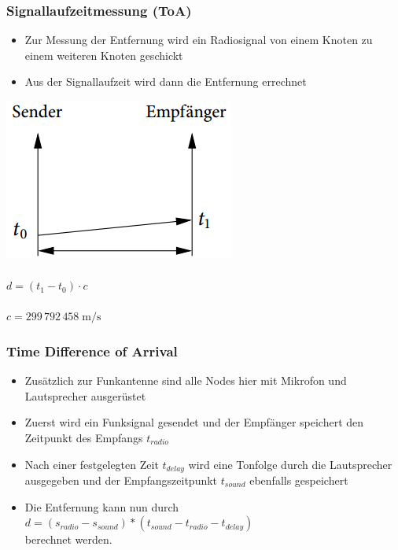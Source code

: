 \begin{frame}
  \frametitle{Signallaufzeitmessung (ToA)}
  \begin{itemize}
    \item Zur Messung der Entfernung wird ein Radiosignal von einem Knoten zu einem weiteren Knoten geschickt
    \item Aus der Signallaufzeit wird dann die Entfernung errechnet
  \end{itemize}
  \begin{center}
    \includegraphics[scale=0.35]{img/time1}\\~\\

    $d = (t_{1} - t_{0}) \cdot c$\\~\\
    $c=299\,792\,458\;\mathrm{m/s}$
  \end{center}
\end{frame}


\begin{frame}
\frametitle{Time Difference of Arrival}
\begin{itemize}
  \item Zusätzlich zur Funkantenne sind alle Nodes hier mit Mikrofon und Lautsprecher ausgerüstet
  \item Zuerst wird ein Funksignal gesendet und der Empfänger speichert den Zeitpunkt des Empfangs $t_{radio}$
  \item Nach einer festgelegten Zeit $t_{delay}$ wird eine Tonfolge durch die Lautsprecher ausgegeben und der Empfangszeitpunkt $t_{sound}$ ebenfalls gespeichert
  \item Die Entfernung kann nun durch $d = (s_{radio} - s_{sound}) * (t_{sound} - t_{radio} - t_{delay})$ \\berechnet werden.
\end{itemize}
\end{frame}

